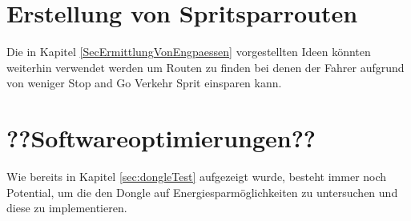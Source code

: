 \section{Erstellung von Spritsparrouten}
Die in Kapitel \ref{SecErmittlungVonEngpaessen} vorgestellten Ideen könnten weiterhin verwendet werden um Routen zu finden bei denen der Fahrer aufgrund von weniger Stop and Go Verkehr Sprit einsparen kann.

\section{??Softwareoptimierungen??}
Wie bereits in Kapitel \ref{sec:dongleTest} aufgezeigt wurde, besteht immer noch Potential, um die den Dongle auf Energiesparmöglichkeiten zu untersuchen und diese zu implementieren.
